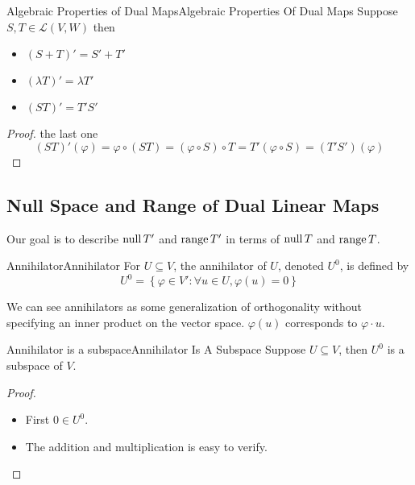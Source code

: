 \documentclass[../main.tex]{subfiles}
\begin{document}
\begin{theorem}{Algebraic Properties of Dual Maps}{Algebraic Properties Of Dual Maps}
Suppose $S,T\in \mathscr{L}(V,W)$ then
\begin{itemize}
\item $(S+T)' = S'+T'$ 
\item $(\lambda T)' = \lambda T'$ 
\item $(ST)' = T'S'$
\end{itemize}
\end{theorem}
\begin{proof}
the last one
\begin{equation*}
	(ST)'(\varphi) = \varphi \circ (ST) = (\varphi\circ S)\circ T = T'(\varphi\circ S) = (T'S')(\varphi)
\end{equation*}
\end{proof}

\subsection{Null Space and Range of Dual Linear Maps}
Our goal is to describe $\operatorname{null} T'$ and $\operatorname{range} T'$ in terms of $\operatorname{null} T$ and $\operatorname{range} T$.
\begin{definition}{Annihilator}{Annihilator}
For $U \subseteq V$, the annihilator of $U$, denoted $U^0$, is defined by
\begin{equation}
U^0 = \left\{ \varphi\in V': \forall u\in U, \varphi(u) = 0 \right\}
\end{equation}
\end{definition}

\begin{remark}
We can see annihilators as some generalization of orthogonality without specifying an inner product on the vector space. $\varphi(u)$ corresponds to $\varphi \cdot u$.
\end{remark}

\begin{theorem}{Annihilator is a subspace}{Annihilator Is A Subspace}
Suppose $U \subseteq V$, then $U^0$ is a subspace of $V$.
\end{theorem}
\begin{proof}
\begin{itemize}
\item First $0\in U^0$.
\item The addition and multiplication is easy to verify.
\end{itemize}
\end{proof}
\end{document}
